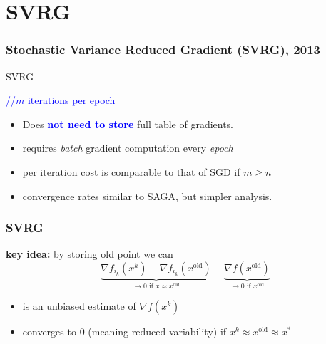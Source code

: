 \documentclass[aspectratio=149]{beamer}
\begin{document}
\section{SVRG}%

\begin{frame}
  \frametitle{Stochastic Variance Reduced Gradient (SVRG), 2013}

  \begin{algorithm}[H]
    \caption{SVRG}\label{}
    \begin{algorithmic}[1]
      \hfill \textcolor{blue}{//$m$ iterations per epoch}
      \EndFor{}
      \EndFor{}
    \end{algorithmic}
  \end{algorithm}
  \begin{itemize}
    \item Does \textbf{\textcolor{blue}{not need to store}} full table of gradients.
    \item requires \emph{batch} gradient computation every \emph{epoch}
    \item per iteration cost is comparable to that of SGD if $m \ge n$
    \item convergence rates similar to SAGA, but simpler analysis.
  \end{itemize}
\end{frame}

\begin{frame}
  \frametitle{SVRG}
  \textbf{key idea:} by storing old point we can
  \begin{equation}
    \underbrace{\nabla f_{i_k}(x^k) - \nabla f_{i_k}(x^{\text{old}})}_{\text{$\to 0$ if $x\approx x^{\text{old}}$}} + \underbrace{\nabla f(x^{\text{old}})}_{\text{$\to 0$ if $x^{\text{old}}$}}
  \end{equation}
  \begin{itemize}
    \item is an unbiased estimate of $\nabla f(x^k)$
    \item converges to $0$ (meaning reduced variability) if $x^k\approx x^{\text{old}} \approx x^*$
  \end{itemize}

\end{frame}
\end{document}
